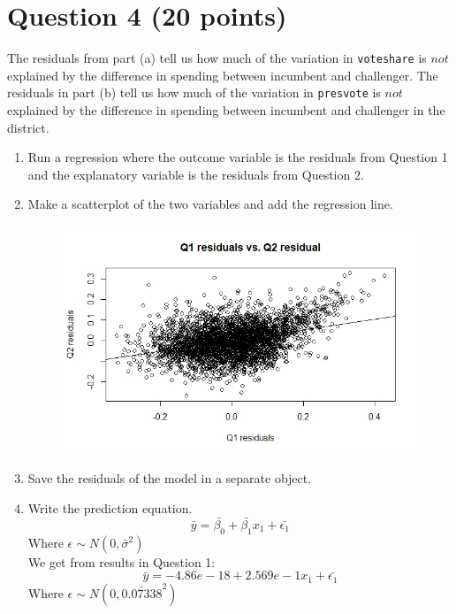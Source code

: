 \documentclass[12pt,letterpaper]{article}
\begin{document}
\newpage	
\section*{Question 4 (20 points)}
\noindent The residuals from part (a) tell us how much of the variation in \texttt{voteshare} is $not$ explained by the difference in spending between incumbent and challenger. The residuals in part (b) tell us how much of the variation in \texttt{presvote} is $not$ explained by the difference in spending between incumbent and challenger in the district.

\begin{enumerate}
	\item Run a regression where the outcome variable is the residuals from Question 1 and the explanatory variable is the residuals from Question 2.
	
	
	\vspace{.5cm}
	
	\item Make a scatterplot of the two variables and add the regression line.
	\begin{figure}[h!]
		\label{figure4}
		\includegraphics[width=\textwidth]{Q4.jpeg}
	\end{figure}		
	\vspace{.5cm}
	\item Save the residuals of the model in a separate object.
	
	\vspace{.5cm}		
	\item Write the prediction equation.
	$$\bar{y} = \bar{\beta_0} + \bar{\beta_1}x_1 + \bar{\epsilon_1}$$ Where $\epsilon \sim N(0, \bar{\sigma}^2)$
	\vspace{.5cm}		
	\\We get from results in Question 1:
	$$\bar{y} = -4.86e-18 + 2.569e-1x_1 + \bar{\epsilon_1}$$ Where $\epsilon \sim N(0, \bar{0.07338}^2)$
\end{enumerate}
	
\end{document}
